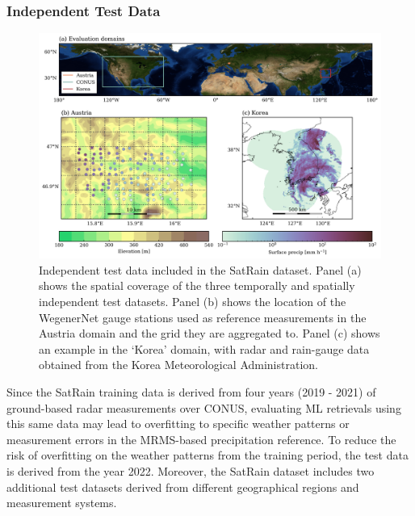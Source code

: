 \documentclass[11pt]{article}
\begin{document}
\subsubsection{Independent Test Data}

\begin{figure}[htbp] %
	\centering
	\includegraphics[width=1.0\textwidth]{figures/fig06}
	\caption{
		Independent test data included in the SatRain dataset. Panel (a) shows the
		spatial coverage of the three temporally and spatially independent test
		datasets. Panel (b) shows the location of the WegenerNet gauge stations used as
		reference measurements in the Austria domain and the grid they are aggregated
		to. Panel (c) shows an example in the ‘Korea’ domain, with radar and rain-gauge
		data obtained from the Korea Meteorological Administration.
	}
	\label{fig:observations_geo}
\end{figure}


Since the SatRain training data is derived from four years (2019 - 2021) of ground-based radar measurements over CONUS, evaluating ML retrievals using this same data may lead to overfitting to specific weather patterns or measurement errors in the MRMS-based precipitation reference. To reduce the risk of overfitting on the weather patterns from the training period, the test data is derived from the year 2022. Moreover, the SatRain dataset includes two additional test datasets derived from different geographical regions and measurement systems.
\end{document}
